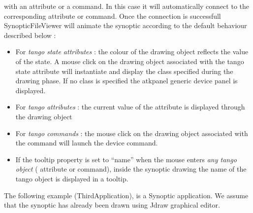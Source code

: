 with an attribute or a command. In this case it will automatically
connect to the corresponding attribute or command. Once the connection
is successfull SynopticFileViewer will animate the synoptic according
to the default behaviour described below :
\begin{itemize}
\item For \emph{tango state attributes} : the colour of the drawing object
reflects the value of the state. A mouse click on the drawing object
associated with the tango state attribute will instantiate and display
the class specified during the drawing phase. If no class is specified
the atkpanel generic device panel is displayed.
\item For \emph{tango attributes} : the current value
of the attribute is displayed through the drawing object
\item For \emph{tango commands} : the mouse click on the
drawing object associated with the command will launch the device
command.
\item If the tooltip property is set to ``name'' when
the mouse enters \emph{any tango object} ( attribute or command),
inside the synoptic drawing the name of the tango object is displayed
in a tooltip.
\end{itemize}
The following example (ThirdApplication), is a Synoptic
application. We assume that the synoptic has already been drawn using
Jdraw graphical editor.

